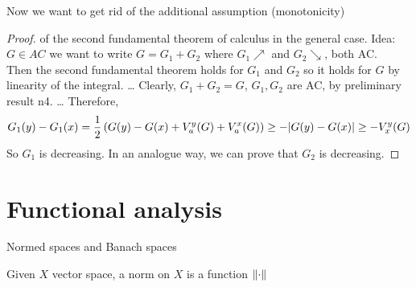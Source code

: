 Now we want to get rid of the additional assumption (monotonicity)

\begin{proof}
    of the second fundamental theorem of calculus in the general case.
    Idea:  \(G \in AC\) 
    we want to write \(G= G_1 + G_2\) where \(G_1 \nearrow \) and \(G_2 \searrow\), both AC. \\
    Then the second fundamental theorem holds for \(G_1 \) and \(G_2\) so it holds for \(G\) by linearity of the integral. 
    \dots
    Clearly, \(G_1+G_2 = G\), \(G_1, G_2\) are AC, by preliminary result n4.
    \dots
    Therefore, 
    \[
        G_1 (y) - G_1(x) = \frac{1}{2} \left(G(y) - G(x) + V_a^y(G) + V_a^x(G)\right) \geq - \abs{G(y) - G(x)} \geq - V_x^y(G)
    \]
    So \(G_1\) is decreasing. In an analogue way, we can prove that \(G_2\) is decreasing.
\end{proof}

\section*{Functional analysis}
Normed spaces and Banach spaces
\begin{definition}
    Given \(X\) vector space, a norm on \(X\) is a function \(\norm{\cdot}\)
\end{definition}

